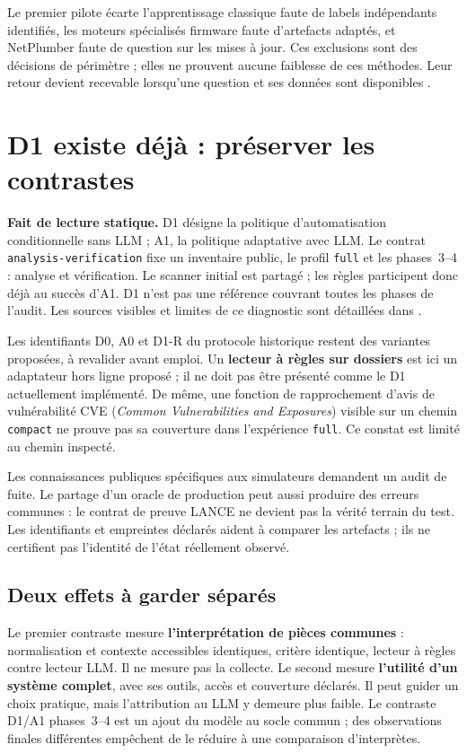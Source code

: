 \documentclass[11pt,a4paper]{article}
\newcommand{\code}[1]{\nolinkurl{#1}}
\begin{document}
Le premier pilote écarte l'apprentissage classique faute de labels
indépendants identifiés, les moteurs spécialisés firmware faute d'artefacts
adaptés, et NetPlumber faute de question sur les mises à jour. Ces exclusions
sont des décisions de périmètre ; elles ne prouvent aucune faiblesse de ces
méthodes. Leur retour devient recevable lorsqu'une question et ses données
sont disponibles \cite{raisonnement}.

\section{D1 existe déjà : préserver les contrastes}
\textbf{Fait de lecture statique.} D1 désigne la politique d'automatisation
conditionnelle sans LLM ; A1, la politique adaptative avec LLM. Le contrat
\code{analysis-verification} fixe un inventaire public, le profil
\code{full} et les phases~3--4 : analyse et vérification. Le scanner initial
est partagé ; les règles participent donc déjà au succès d'A1. D1 n'est pas
une référence couvrant toutes les phases de l'audit. Les sources visibles
et limites de ce diagnostic sont détaillées dans \cite{experiences}.

Les identifiants D0, A0 et D1-R du protocole historique restent des variantes
proposées, à revalider avant emploi. Un \textbf{lecteur à règles sur dossiers}
est ici un adaptateur hors ligne proposé ; il ne doit pas être présenté comme
le D1 actuellement implémenté. De même, une fonction de rapprochement d'avis
de vulnérabilité CVE (\emph{Common Vulnerabilities and Exposures}) visible
sur un chemin \code{compact} ne prouve pas sa couverture dans l'expérience
\code{full}. Ce constat est limité au chemin inspecté.

Les connaissances publiques spécifiques aux simulateurs demandent un audit
de fuite. Le partage d'un oracle de production peut aussi produire des erreurs
communes : le contrat de preuve LANCE ne devient pas la vérité terrain du test.
Les identifiants et empreintes déclarés aident à comparer les artefacts ; ils
ne certifient pas l'identité de l'état réellement observé.

\subsection{Deux effets à garder séparés}
Le premier contraste mesure \textbf{l'interprétation de pièces communes} :
normalisation et contexte accessibles identiques, critère identique, lecteur à
règles contre lecteur LLM. Il ne mesure pas la collecte. Le second mesure
\textbf{l'utilité d'un système complet}, avec ses outils, accès et couverture
déclarés. Il peut guider un choix pratique, mais l'attribution au LLM y demeure
plus faible. Le contraste D1/A1 phases~3--4 est un ajout du modèle au socle
commun ; des observations finales différentes empêchent de le réduire à une
comparaison d'interprètes.
\end{document}
